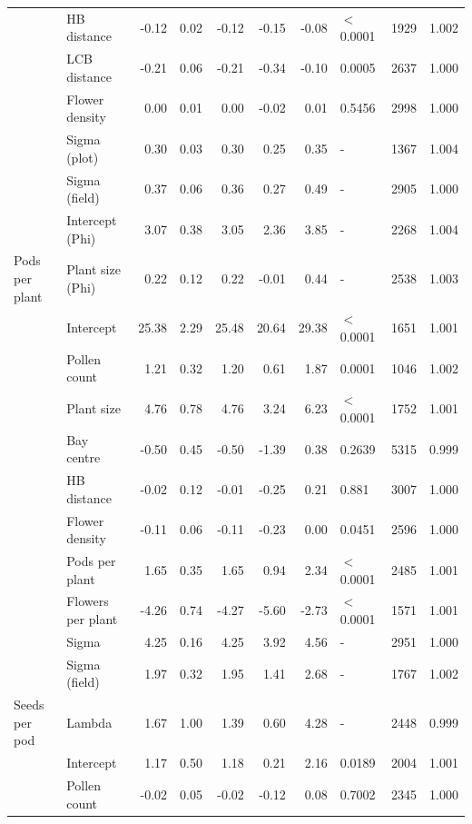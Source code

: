 \documentclass[12pt]{article} %
\begin{document}
\begin{longtable}{l|l|r|r|r|r|r|l|r|r}
 & HB distance & -0.12 & 0.02 & -0.12 & -0.15 & -0.08 & $<$0.0001 & 1929 & 1.002\\
\cline{2-10}
 & LCB distance & -0.21 & 0.06 & -0.21 & -0.34 & -0.10 & 0.0005 & 2637 & 1.000\\
\cline{2-10}
 & Flower density & 0.00 & 0.01 & 0.00 & -0.02 & 0.01 & 0.5456 & 2998 & 1.000\\
\cline{2-10}
 & Sigma (plot) & 0.30 & 0.03 & 0.30 & 0.25 & 0.35 & - & 1367 & 1.004\\
\cline{2-10}
 & Sigma (field) & 0.37 & 0.06 & 0.36 & 0.27 & 0.49 & - & 2905 & 1.000\\
\cline{2-10}
 & Intercept (Phi) & 3.07 & 0.38 & 3.05 & 2.36 & 3.85 & - & 2268 & 1.004\\
\cline{2-10}
\multirow{-11}{*}{\raggedright\arraybackslash Pods per plant} & Plant size (Phi) & 0.22 & 0.12 & 0.22 & -0.01 & 0.44 & - & 2538 & 1.003\\
\cline{1-10}
 & Intercept & 25.38 & 2.29 & 25.48 & 20.64 & 29.38 & $<$0.0001 & 1651 & 1.001\\
\cline{2-10}
 & Pollen count & 1.21 & 0.32 & 1.20 & 0.61 & 1.87 & 0.0001 & 1046 & 1.002\\
\cline{2-10}
 & Plant size & 4.76 & 0.78 & 4.76 & 3.24 & 6.23 & $<$0.0001 & 1752 & 1.001\\
\cline{2-10}
 & Bay centre & -0.50 & 0.45 & -0.50 & -1.39 & 0.38 & 0.2639 & 5315 & 0.999\\
\cline{2-10}
 & HB distance & -0.02 & 0.12 & -0.01 & -0.25 & 0.21 & 0.881 & 3007 & 1.000\\
\cline{2-10}
 & Flower density & -0.11 & 0.06 & -0.11 & -0.23 & 0.00 & 0.0451 & 2596 & 1.000\\
\cline{2-10}
 & Pods per plant & 1.65 & 0.35 & 1.65 & 0.94 & 2.34 & $<$0.0001 & 2485 & 1.001\\
\cline{2-10}
 & Flowers per plant & -4.26 & 0.74 & -4.27 & -5.60 & -2.73 & $<$0.0001 & 1571 & 1.001\\
\cline{2-10}
 & Sigma & 4.25 & 0.16 & 4.25 & 3.92 & 4.56 & - & 2951 & 1.000\\
\cline{2-10}
 & Sigma (field) & 1.97 & 0.32 & 1.95 & 1.41 & 2.68 & - & 1767 & 1.002\\
\cline{2-10}
\multirow{-11}{*}{\raggedright\arraybackslash Seeds per pod} & Lambda & 1.67 & 1.00 & 1.39 & 0.60 & 4.28 & - & 2448 & 0.999\\
\cline{1-10}
 & Intercept & 1.17 & 0.50 & 1.18 & 0.21 & 2.16 & 0.0189 & 2004 & 1.001\\
\cline{2-10}
 & Pollen count & -0.02 & 0.05 & -0.02 & -0.12 & 0.08 & 0.7002 & 2345 & 1.000\\

\end{longtable}
\end{document}
